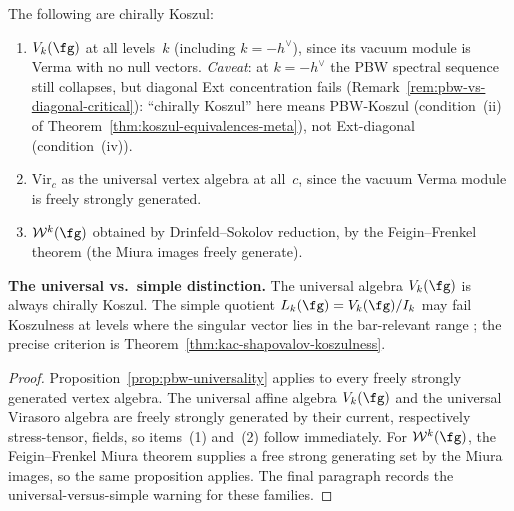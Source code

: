 \begin{corollary}
\label{cor:universal-koszul}

The following are chirally Koszul:
\begin{enumerate}
\item $V_k(\fg)$ at all levels~$k$ \textup{(}including $k = -h^\vee$\textup{)},
 since its vacuum module is Verma with no null vectors.
 \emph{Caveat}: at $k = -h^\vee$ the PBW spectral sequence
 still collapses, but diagonal Ext concentration fails
 \textup{(}Remark~\textup{\ref{rem:pbw-vs-diagonal-critical}}\textup{)}:
 ``chirally Koszul'' here means PBW-Koszul
 \textup{(}condition~\textup{(ii)} of
 Theorem~\textup{\ref{thm:koszul-equivalences-meta}}\textup{)},
 not Ext-diagonal
 \textup{(}condition~\textup{(iv)}\textup{)}.
\item $\mathrm{Vir}_c$ as the universal vertex algebra at all~$c$,
 since the vacuum Verma module is freely strongly generated.
\item $\mathcal{W}^k(\fg)$ obtained by Drinfeld--Sokolov reduction,
 by the Feigin--Frenkel theorem \textup{(}the Miura images freely
 generate\textup{)}.
\end{enumerate}

\noindent\textbf{The universal vs.\ simple distinction.}
The universal algebra $V_k(\fg)$ is always chirally Koszul.
The simple quotient $L_k(\fg) = V_k(\fg)/I_k$ may fail Koszulness
at levels where the singular vector lies in the bar-relevant range
; the precise criterion is
Theorem~\textup{\ref{thm:kac-shapovalov-koszulness}}.
\end{corollary}

\begin{proof}
Proposition~\ref{prop:pbw-universality} applies to every freely
strongly generated vertex algebra. The universal affine algebra
$V_k(\fg)$ and the universal Virasoro algebra are freely strongly
generated by their current, respectively stress-tensor, fields, so
items~(1) and~(2) follow immediately. For
$\mathcal{W}^k(\fg)$, the Feigin--Frenkel Miura theorem supplies a
free strong generating set by the Miura images, so the same
proposition applies. The final paragraph records the
universal-versus-simple warning for these families.
\end{proof}

